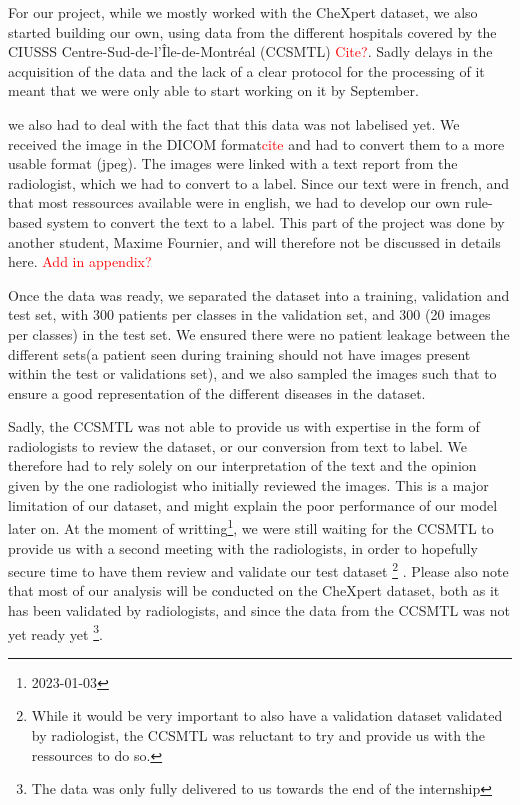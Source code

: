 \documentclass[11pt]{article}
\newcommand\myworries[1]{\textcolor{red}{#1}}
\begin{document}
        For our project, while we mostly worked with the CheXpert dataset, we also started building our own, using
        data from the different hospitals covered by the CIUSSS Centre-Sud-de-l'Île-de-Montréal (CCSMTL)
    \myworries{Cite?}. Sadly delays in the acquisition of the data and the lack of a clear protocol for the
    processing of it meant that we were only able to start working on it by September.

    we also had to deal with the fact that this data was not labelised yet. We received the image in the DICOM
    format\myworries{cite} and had to convert them to a more usable format (jpeg). The images were linked with a text
    report from the radiologist, which we had to convert to a label. Since our text were in french, and that most
    ressources available were in english, we had to develop our own rule-based system to convert the text to a label.
    This part of the project was done by another student, Maxime Fournier, and will therefore not be discussed in
    details here. \myworries{Add in appendix?}

    Once the data was ready, we separated the dataset into a training, validation and test set, with 300 patients per
    classes in the validation set, and 300 (20 images per classes) in the test set.
    We ensured there were no patient leakage between the different sets(a patient seen during training should not
    have images present within the test or validations set), and we also sampled the images such that to ensure a
    good representation of the different diseases in the dataset.

    Sadly, the CCSMTL was not able to provide us with expertise in the form of radiologists to review the dataset, or
    our conversion from text to label. We therefore had to rely solely on our interpretation of the text and the
    opinion given by the one radiologist who initially reviewed the images. This is a major limitation of our dataset,
    and might explain the poor performance of our model later on. At the moment of writting\footnote{2023-01-03}, we
    were still waiting  for the CCSMTL to provide us with a second meeting with the radiologists, in order to
    hopefully secure time to have them review and validate our test dataset \footnote{While it would be very
    important to also have a validation dataset validated by radiologist, the CCSMTL was reluctant to try and provide
    us with the ressources to do so.} . Please also note that most
    of our analysis will be conducted on the CheXpert dataset, both as it has been validated by radiologists, and
    since the data from the CCSMTL was not yet ready yet \footnote{The data was only fully delivered to us towards
    the end of the internship}.
\end{document}
